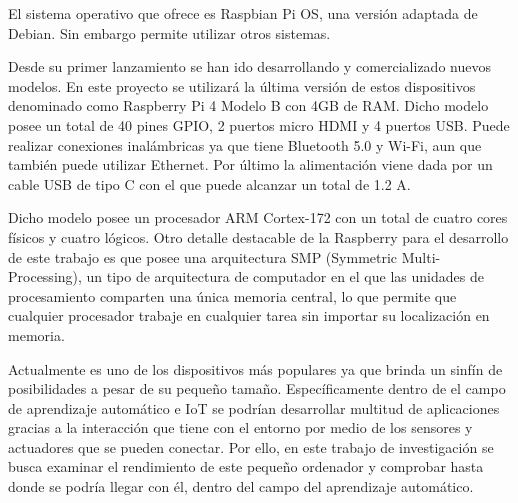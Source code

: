 \documentclass[a4paper, 12pt]{book}
\begin{document}
El sistema operativo que ofrece es Raspbian Pi OS, una versión adaptada de Debian. Sin embargo permite utilizar otros sistemas.

Desde su primer lanzamiento se han ido desarrollando y comercializado nuevos modelos. En este proyecto se utilizará la última versión de estos dispositivos denominado como Raspberry Pi 4 Modelo B con 4GB de RAM. Dicho modelo posee un total de 40 pines GPIO, 2 puertos micro HDMI y 4 puertos USB. Puede realizar conexiones inalámbricas ya que tiene Bluetooth 5.0 y Wi-Fi, aun que también puede utilizar Ethernet. Por último la alimentación viene dada por un cable USB de tipo C con el que puede alcanzar un total de 1.2 A.

Dicho modelo posee un procesador ARM Cortex-172 con un total de cuatro cores físicos y cuatro lógicos. Otro detalle destacable de la Raspberry para el desarrollo de este trabajo es que posee una arquitectura SMP (Symmetric Multi-Processing), un tipo de arquitectura de computador en el que las unidades de procesamiento comparten una única memoria central, lo que permite que cualquier procesador trabaje en cualquier tarea sin importar su localización en memoria. 

Actualmente es uno de los dispositivos más populares ya que brinda un sinfín de posibilidades a pesar de su pequeño tamaño. Específicamente dentro de el campo de aprendizaje automático e IoT se podrían desarrollar multitud de aplicaciones gracias a la interacción que tiene con el entorno por medio de los sensores y actuadores que se pueden conectar. Por ello, en este trabajo de investigación se busca examinar el rendimiento de este pequeño ordenador y comprobar hasta donde se podría llegar con él, dentro del campo del aprendizaje automático. 

\end{document}
